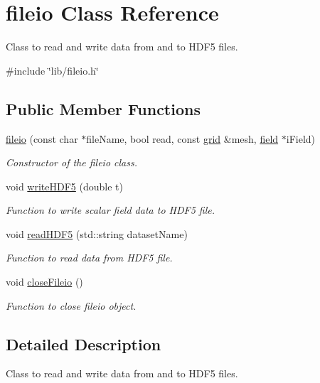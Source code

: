 \hypertarget{classfileio}{}\section{fileio Class Reference}
\label{classfileio}


Class to read and write data from and to H\+D\+F5 files.  




{\ttfamily \#include \char`\"{}lib/fileio.\+h\char`\"{}}

\subsection*{Public Member Functions}
\begin{DoxyCompactItemize}
\item 
\hyperlink{classfileio_aa2fda45bd859d0a8aa1cde9cada7b31c}{fileio} (const char $\ast$file\+Name, bool read, const \hyperlink{classgrid}{grid} \&mesh, \hyperlink{classfield}{field} $\ast$i\+Field)
\begin{DoxyCompactList}\small\item\em Constructor of the fileio class. \end{DoxyCompactList}\item 
void \hyperlink{classfileio_ad225b147a6799b6adaaac5745ff54e1a}{write\+H\+D\+F5} (double t)
\begin{DoxyCompactList}\small\item\em Function to write scalar field data to H\+D\+F5 file. \end{DoxyCompactList}\item 
void \hyperlink{classfileio_ad87cac9f787b843aee05c312cec90e59}{read\+H\+D\+F5} (std\+::string dataset\+Name)
\begin{DoxyCompactList}\small\item\em Function to read data from H\+D\+F5 file. \end{DoxyCompactList}\item 
void \hyperlink{classfileio_ac1c3e21a9113991a543193197e6b60f9}{close\+Fileio} ()
\begin{DoxyCompactList}\small\item\em Function to close fileio object. \end{DoxyCompactList}\end{DoxyCompactItemize}


\subsection{Detailed Description}
Class to read and write data from and to H\+D\+F5 files. 

